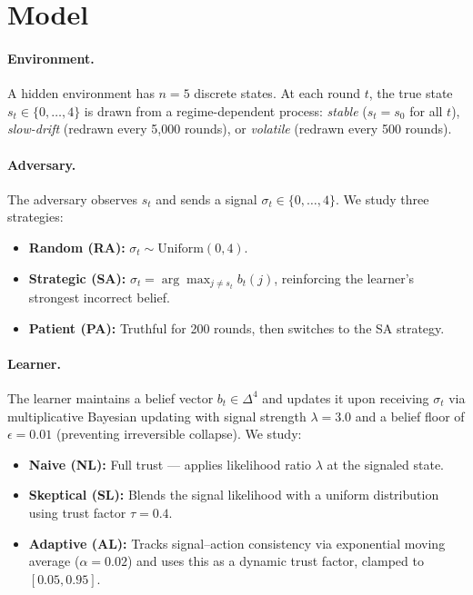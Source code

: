 \documentclass[11pt,letterpaper]{article}
\begin{document}
\section{Model}

\paragraph{Environment.}
A hidden environment has $n = 5$ discrete states.  At each round $t$,
the true state $s_t \in \{0, \ldots, 4\}$ is drawn from a
regime-dependent process: \emph{stable} ($s_t = s_0$ for all $t$),
\emph{slow-drift} (redrawn every 5{,}000 rounds), or \emph{volatile}
(redrawn every 500 rounds).

\paragraph{Adversary.}
The adversary observes $s_t$ and sends a signal
$\sigma_t \in \{0, \ldots, 4\}$.  We study three strategies:
\begin{itemize}
  \item \textbf{Random (RA):} $\sigma_t \sim \mathrm{Uniform}(0, 4)$.
  \item \textbf{Strategic (SA):} $\sigma_t = \arg\max_{j \neq s_t} b_t(j)$,
    reinforcing the learner's strongest incorrect belief.
  \item \textbf{Patient (PA):} Truthful for 200 rounds, then switches
    to the SA strategy.
\end{itemize}

\paragraph{Learner.}
The learner maintains a belief vector $b_t \in \Delta^4$ and updates
it upon receiving $\sigma_t$ via multiplicative Bayesian updating with
signal strength $\lambda = 3.0$ and a belief floor of $\epsilon =
0.01$ (preventing irreversible collapse).  We study:
\begin{itemize}
  \item \textbf{Naive (NL):} Full trust --- applies likelihood ratio
    $\lambda$ at the signaled state.
  \item \textbf{Skeptical (SL):} Blends the signal likelihood with a
    uniform distribution using trust factor $\tau = 0.4$.
  \item \textbf{Adaptive (AL):} Tracks signal--action consistency via
    exponential moving average ($\alpha = 0.02$) and uses this as a
    dynamic trust factor, clamped to $[0.05, 0.95]$.
\end{itemize}
\end{document}
